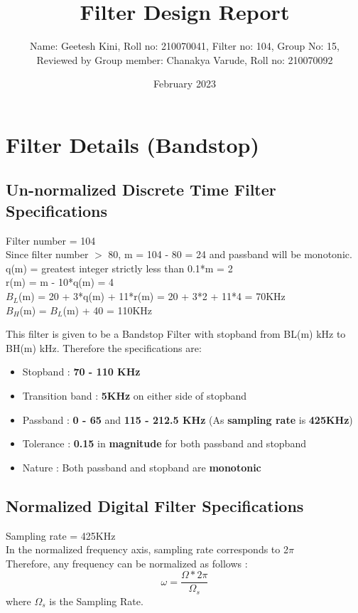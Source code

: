 \documentclass{article}
\title{Filter Design Report}
\author{Name: Geetesh Kini, Roll no: 210070041, Filter no: 104, Group No: 15,\\ Reviewed by Group member: Chanakya Varude, Roll no: 210070092}
\date{February 2023}
\begin{document}
\maketitle

\tableofcontents
\clearpage

\section{Filter Details (Bandstop)}
\subsection{Un-normalized Discrete Time Filter Specifications}

Filter number = 104\\
Since filter number $>$ 80, m = 104 - 80 = 24 and passband will be monotonic.\\
q(m) = greatest integer strictly less than 0.1*m = 2\\
r(m) = m - 10*q(m) = 4\\
$B_L$(m) = 20 + 3*q(m) + 11*r(m) = 20 + 3*2 + 11*4 = 70KHz \\
$B_H$(m) = $B_L$(m) + 40 = 110KHz\\

\vspace{1.5em}
\noindent

This filter is given to be a Bandstop Filter with stopband from BL(m) kHz to BH(m) kHz.
Therefore the specifications are:
\begin{itemize}
    \item Stopband : \textbf{70 - 110 KHz}
    \item  Transition band : \textbf{5KHz} on either side of stopband
    \item Passband : \textbf{0 - 65} and \textbf{115 - 212.5 KHz} (As \textbf{sampling rate} is \textbf{425KHz})

    \item  Tolerance : \textbf{0.15} in \textbf{magnitude} for both passband and stopband
    \item  Nature : Both passband and stopband are \textbf{monotonic}
\end{itemize}


\subsection{Normalized Digital Filter Specifications}
Sampling rate = 425KHz\\
In the normalized frequency axis, sampling rate corresponds to 2$\pi$\\
Therefore, any frequency can be normalized as follows :
\begin{equation*}
    \omega = \frac{\Omega*2\pi}{\Omega_s}
\end{equation*}
where $\Omega_s$ is the Sampling Rate.\\
\end{document}
